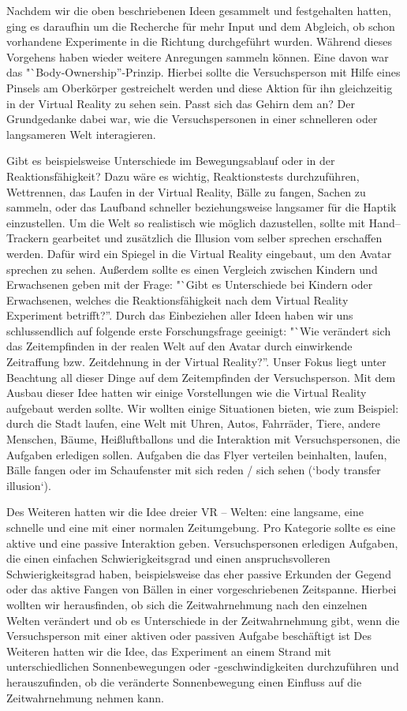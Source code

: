 \documentclass{Bericht}
\begin{document}
	Nachdem wir die oben beschriebenen Ideen gesammelt und festgehalten hatten, ging es daraufhin um die Recherche für mehr Input und dem Abgleich, ob schon vorhandene Experimente in die Richtung durchgeführt wurden. Während dieses Vorgehens haben wieder weitere Anregungen sammeln können. Eine davon war das "`Body-Ownership''-Prinzip. Hierbei sollte die Versuchsperson mit Hilfe eines Pinsels am Oberkörper gestreichelt werden und diese Aktion für ihn gleichzeitig in der Virtual Reality zu sehen sein. 
Passt sich das Gehirn dem an? Der Grundgedanke dabei war, wie die Versuchspersonen in einer schnelleren oder langsameren Welt interagieren. 

Gibt es beispielsweise Unterschiede im Bewegungsablauf oder in der Reaktionsfähigkeit? Dazu wäre es wichtig, Reaktionstests durchzuführen, Wettrennen, das Laufen in der Virtual Reality, Bälle zu fangen, Sachen zu sammeln, oder das Laufband schneller beziehungsweise langsamer für die Haptik einzustellen. Um die Welt so realistisch wie möglich dazustellen, sollte mit Hand–Trackern gearbeitet und zusätzlich die Illusion vom selber sprechen erschaffen werden. Dafür wird ein Spiegel in die Virtual Reality eingebaut, um den Avatar sprechen zu sehen. Außerdem sollte es einen Vergleich zwischen Kindern und Erwachsenen geben mit der Frage: "`Gibt es Unterschiede bei Kindern oder Erwachsenen, welches die Reaktionsfähigkeit nach dem Virtual Reality Experiment betrifft?''. Durch das Einbeziehen aller Ideen haben wir uns schlussendlich auf folgende erste Forschungsfrage geeinigt: "`Wie verändert sich das Zeitempfinden in der realen Welt auf den Avatar durch einwirkende Zeitraffung bzw. Zeitdehnung in der Virtual Reality?''. Unser Fokus liegt unter Beachtung all dieser Dinge auf dem Zeitempfinden der Versuchsperson. Mit dem Ausbau dieser Idee hatten wir einige Vorstellungen wie die Virtual Reality aufgebaut werden sollte. Wir wollten einige Situationen bieten, wie zum Beispiel: durch die Stadt laufen, eine Welt mit Uhren, Autos, Fahrräder, Tiere, andere Menschen, Bäume, Heißluftballons und die Interaktion mit Versuchspersonen, die Aufgaben erledigen sollen. Aufgaben die das Flyer verteilen beinhalten, laufen, Bälle fangen oder im Schaufenster mit sich reden / sich sehen (‘body transfer illusion‘).

	Des Weiteren hatten wir die Idee dreier VR – Welten: eine langsame, eine schnelle und eine mit einer normalen Zeitumgebung. Pro Kategorie sollte es eine aktive und eine passive Interaktion geben. Versuchspersonen erledigen Aufgaben, die einen einfachen Schwierigkeitsgrad und einen anspruchsvolleren Schwierigkeitsgrad haben, beispielsweise das eher passive Erkunden der Gegend oder das aktive Fangen von Bällen in einer vorgeschriebenen Zeitspanne. Hierbei wollten wir herausfinden, ob sich die Zeitwahrnehmung nach den einzelnen Welten verändert und ob es Unterschiede in der Zeitwahrnehmung gibt, wenn die Versuchsperson mit einer aktiven oder passiven Aufgabe beschäftigt ist  Des Weiteren hatten wir die Idee, das Experiment an einem Strand mit unterschiedlichen Sonnenbewegungen oder -geschwindigkeiten durchzuführen und herauszufinden, ob die veränderte Sonnenbewegung einen Einfluss auf die Zeitwahrnehmung nehmen kann. 
\end{document}
